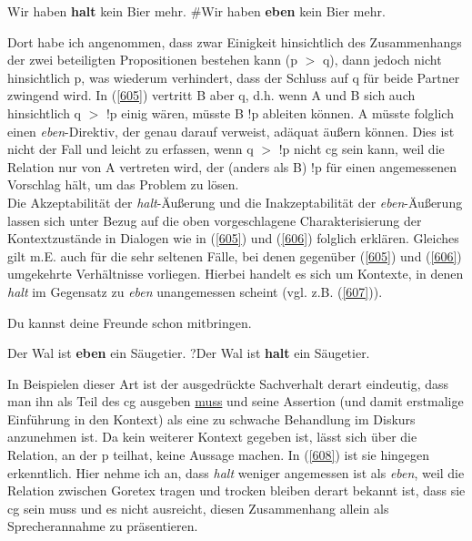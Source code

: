 \begin{exe}
	\ex\label{606} 
		\begin{xlist}	
			\ex\label{606a} Wir haben \textbf{halt} kein Bier mehr.
			\ex\label{606b} \#Wir haben \textbf{eben} kein Bier mehr.
		\end{xlist}
\end{exe}
Dort habe ich angenommen, dass zwar Einigkeit hinsichtlich des Zusammenhangs der zwei beteiligten Propositionen bestehen kann (p $>$ q), dann jedoch nicht hinsichtlich p, was wiederum verhindert, dass der Schluss auf q für beide Partner zwingend wird. In (\ref{605}) vertritt B aber q, d.h. wenn A und B sich auch hinsichtlich q $>$ !p einig wären, müsste B !p ableiten können. A müsste folglich einen \textit{eben}-Direktiv, der genau darauf verweist, adäquat äußern können. Dies ist nicht der Fall und leicht zu erfassen, wenn q $>$ !p nicht cg sein kann, weil die Relation nur von A vertreten wird, der (anders als B) !p für einen angemessenen Vorschlag hält, um das Problem zu lösen.\\
\newline
Die Akzeptabilität der \textit{halt}-Äußerung und die Inakzeptabilität der \textit{eben}-Äußerung lassen sich unter Bezug auf die oben vorgeschlagene Charakterisierung der Kontextzustände in Dialogen wie in (\ref{605}) und (\ref{606}) folglich erklären. Gleiches gilt m.E. auch für die sehr seltenen Fälle, bei denen gegenüber (\ref{605}) und (\ref{606}) umgekehrte Verhältnisse vorliegen. Hierbei handelt es sich um Kontexte, in denen \textit{halt} im Gegensatz zu \textit{eben} unangemessen scheint (vgl. z.B. (\ref{607})).
	
\begin{exe}
	\ex\label{607} Du kannst deine Freunde schon mitbringen.
		\begin{xlist}	
			\ex\label{607a} Der Wal ist \textbf{eben} ein Säugetier.
			\ex\label{607b} ?Der Wal ist \textbf{halt} ein Säugetier.
		\end{xlist}
\end{exe}	
In Beispielen dieser Art ist der ausgedrückte Sachverhalt derart eindeutig, dass man ihn als Teil des cg ausgeben \underline{muss} und seine Assertion (und damit erstmalige Einführung in den Kontext) als eine zu schwache Behandlung im Diskurs anzunehmen ist. Da kein weiterer Kontext gegeben ist, lässt sich über die Relation, an der p teilhat, keine Aussage machen. In (\ref{608}) ist sie hingegen erkenntlich. Hier nehme ich an, dass \textit{halt} weniger angemessen ist als \textit{eben}, weil die Relation zwischen Goretex tragen und trocken bleiben derart bekannt ist, dass sie cg sein muss und es nicht ausreicht, diesen Zusammenhang allein als Sprecherannahme zu präsentieren.

